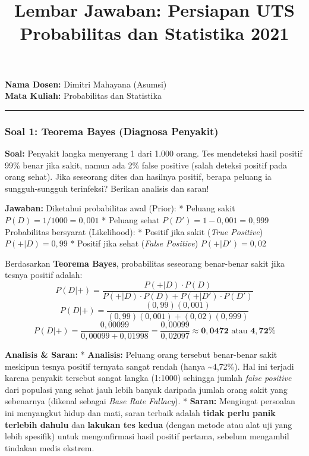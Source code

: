 \documentclass[
  letterpaper,
  DIV=11,
  numbers=noendperiod]{scrartcl}
\title{Lembar Jawaban: Persiapan UTS Probabilitas dan Statistika 2021}
\author{}
\date{}
\begin{document}
\maketitle


\textbf{Nama Dosen:} Dimitri Mahayana (Asumsi)\\
\textbf{Mata Kuliah:} Probabilitas dan Statistika

\begin{center}\rule{0.5\linewidth}{0.5pt}\end{center}

\subsubsection{\texorpdfstring{\textbf{Soal 1: Teorema Bayes (Diagnosa
Penyakit)}}{Soal 1: Teorema Bayes (Diagnosa Penyakit)}}\label{soal-1-teorema-bayes-diagnosa-penyakit}

\textbf{Soal:} Penyakit langka menyerang 1 dari 1.000 orang. Tes
mendeteksi hasil positif 99\% benar jika sakit, namun ada 2\% false
positive (salah deteksi positif pada orang sehat). Jika seseorang dites
dan hasilnya positif, berapa peluang ia sungguh-sungguh terinfeksi?
Berikan analisis dan saran!

\textbf{Jawaban:} Diketahui probabilitas awal (Prior): * Peluang sakit
\(P(D) = 1/1000 = 0,001\) * Peluang sehat \(P(D') = 1 - 0,001 = 0,999\)
Probabilitas bersyarat (Likelihood): * Positif jika sakit (\emph{True
Positive}) \(P(+|D) = 0,99\) * Positif jika sehat (\emph{False
Positive}) \(P(+|D') = 0,02\)

Berdasarkan \textbf{Teorema Bayes}, probabilitas seseorang benar-benar
sakit jika tesnya positif adalah:
\[ P(D|+) = \frac{P(+|D) \cdot P(D)}{P(+|D) \cdot P(D) + P(+|D') \cdot P(D')} \]
\[ P(D|+) = \frac{(0,99)(0,001)}{(0,99)(0,001) + (0,02)(0,999)} \]
\[ P(D|+) = \frac{0,00099}{0,00099 + 0,01998} = \frac{0,00099}{0,02097} \approx \mathbf{0,0472} \text{ atau } \mathbf{4,72\%} \]

\textbf{Analisis \& Saran:} * \textbf{Analisis:} Peluang orang tersebut
benar-benar sakit meskipun tesnya positif ternyata sangat rendah (hanya
\textasciitilde4,72\%). Hal ini terjadi karena penyakit tersebut sangat
langka (1:1000) sehingga jumlah \emph{false positive} dari populasi yang
sehat jauh lebih banyak daripada jumlah orang sakit yang sebenarnya
(dikenal sebagai \emph{Base Rate Fallacy}). * \textbf{Saran:} Mengingat
persoalan ini menyangkut hidup dan mati, saran terbaik adalah
\textbf{tidak perlu panik terlebih dahulu} dan \textbf{lakukan tes
kedua} (dengan metode atau alat uji yang lebih spesifik) untuk
mengonfirmasi hasil positif pertama, sebelum mengambil tindakan medis
ekstrem.
\end{document}
